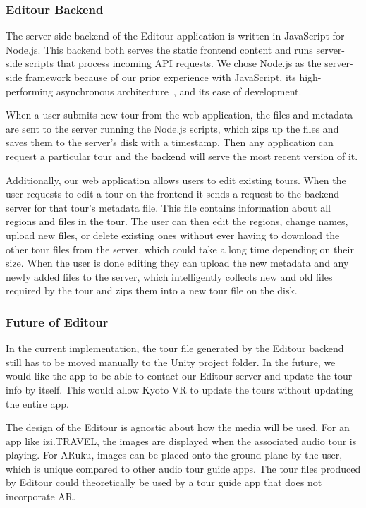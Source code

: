 \documentclass[a4paper, 10pt, american, titlepage]{article}
\begin{document}
\subsubsection{Editour Backend}
\label{sec:editourBackend}

The server-side backend of the Editour application is written in JavaScript for
Node.js. This backend both serves the static frontend content and runs
server-side scripts that process incoming API requests.  We chose Node.js as the
server-side framework because of our prior experience with JavaScript, its
high-performing asynchronous architecture~\autocite{orsini2013}, and its ease of
development.

When a user submits new tour from the web application, the files and metadata
are sent to the server running the Node.js scripts, which zips up the files and
saves them to the server's disk with a timestamp. Then any application can
request a particular tour and the backend will serve the most recent version of
it.

Additionally, our web application allows users to edit existing tours. When the
user requests to edit a tour on the frontend it sends a request to the backend
server for that tour's metadata file. This file contains information about all
regions and files in the tour. The user can then edit the regions, change names,
upload new files, or delete existing ones without ever having to download the
other tour files from the server, which could take a long time depending on
their size. When the user is done editing they can upload the new metadata and
any newly added files to the server, which intelligently collects new and old
files required by the tour and zips them into a new tour file on the disk.

\subsubsection{Future of Editour}
\label{sec:futureOfEditour}

In the current implementation, the tour file generated by the Editour backend
still has to be moved manually to the Unity project folder. In the future, we
would like the app to be able to contact our Editour server and update the tour
info by itself. This would allow Kyoto VR to update the tours without updating
the entire app.

The design of the Editour is agnostic about how the media will be used.  For
an app like izi.TRAVEL, the images are displayed when the associated audio
tour is playing. For ARuku, images can be placed onto the ground plane by the
user, which is unique compared to other audio tour guide apps. The tour files
produced by Editour could theoretically be used by a tour guide app that does
not incorporate AR. 
\end{document}
